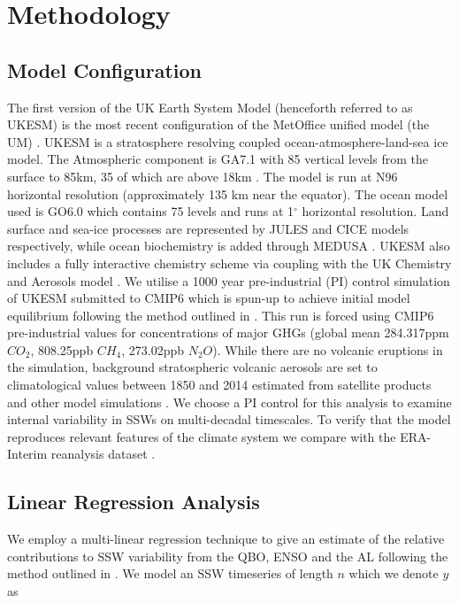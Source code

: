 \documentclass[wcd, manuscript]{copernicus}
\begin{document}
\section{Methodology}
\subsection{Model Configuration}
The first version of the UK Earth System Model (henceforth referred to as UKESM) is the most recent configuration of the MetOffice unified model (the UM) \citep{Mulcahy2018}. UKESM is a stratosphere resolving coupled ocean-atmosphere-land-sea ice model. The Atmospheric component is GA7.1 with 85 vertical levels from the surface to 85km, 35 of which are above 18km \citep{Walters2019, Williams2018}. The model is run at N96 horizontal resolution (approximately 135 km near the equator). The ocean model used is GO6.0 \citep{Storkey2018} which contains 75 levels and runs at 1${^\circ}$ horizontal resolution. Land surface and sea-ice processes are represented by JULES \citep[GL7.0,][]{Walters2019} and CICE  \cite[GSI8.1,][]{Ridley2018} models respectively, while ocean biochemistry is added through MEDUSA \citep{Yool2013}. UKESM also includes a fully interactive chemistry scheme via coupling with the UK Chemistry and Aerosols model \citep[UKCA,][]{Mulcahy2018}. We utilise a 1000 year pre-industrial (PI) control simulation of UKESM submitted to CMIP6 which is spun-up to achieve initial model equilibrium following the method outlined in \cite{Yool20}. This run is forced using CMIP6 pre-industrial values for concentrations of major GHGs (global mean 284.317ppm $CO_2$, 808.25ppb $CH_4$, 273.02ppb $N_2O$). While there are no volcanic eruptions in the simulation, background stratospheric volcanic aerosols are set to climatological values between 1850 and 2014 estimated from satellite products and other model simulations \citep{Menary2018}. We choose a PI control for this analysis to examine internal variability in SSWs on multi-decadal timescales. To verify that the model reproduces relevant features of the climate system we compare with the ERA-Interim reanalysis dataset \citep{Dee2011}. 

\subsection{Linear Regression Analysis}
We employ a multi-linear regression technique to give an estimate of the relative contributions to SSW variability from the QBO, ENSO and the AL following the method outlined in \cite{Krzywinski}. We model an SSW timeseries of length $n$ which we denote $y$ as 
\end{document}
